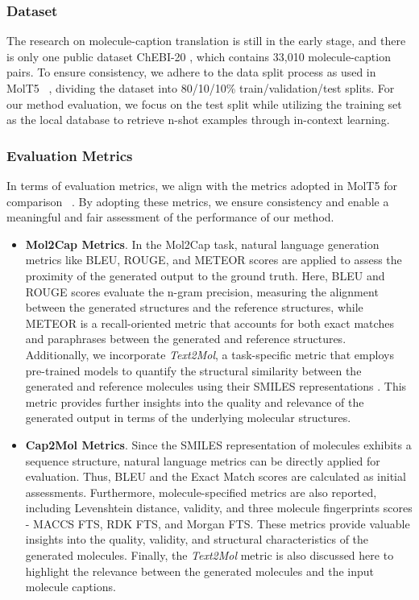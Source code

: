 \documentclass{article}
\theoremstyle{plain}
\theoremstyle{definition}
\theoremstyle{remark}
\begin{document}
\subsubsection{Dataset}
The research on molecule-caption translation is still in the early stage, and there is only one public dataset ChEBI-20 \cite{edwards2021text2mol}, which contains 33,010 molecule-caption pairs. To ensure consistency, we adhere to the data split process as used in MolT5 ~\cite{edwards-etal-2022-translation}, dividing the dataset into 80/10/10\% train/validation/test splits. 
For our method evaluation, we focus on the test split while utilizing the training set as the local database to retrieve n-shot examples through in-context learning. 

\subsubsection{Evaluation Metrics}
In terms of evaluation metrics, we align with the metrics adopted in MolT5 for comparison ~\cite{edwards-etal-2022-translation}. By adopting these metrics, we ensure consistency and enable a meaningful and fair assessment of the performance of our method.
\begin{itemize}

\item \textbf{Mol2Cap Metrics}. 
In the Mol2Cap task, natural language generation metrics like BLEU, ROUGE, and METEOR scores are applied to assess the proximity of the generated output to the ground truth. 
Here, BLEU and ROUGE scores evaluate the n-gram precision, measuring the alignment between the generated structures and the reference structures, while METEOR is a recall-oriented metric that accounts for both exact matches and paraphrases between the generated and reference structures.
Additionally, we incorporate \emph{Text2Mol}, a task-specific metric that employs pre-trained models to quantify the structural similarity between the generated and reference molecules using their SMILES representations \cite{edwards2021text2mol}.
This metric provides further insights into the quality and relevance of the generated output in terms of the underlying molecular structures.

\item \textbf{Cap2Mol Metrics}. 
Since the SMILES representation of molecules exhibits a sequence structure, natural language metrics can be directly applied for evaluation. Thus, BLEU and the Exact Match scores are calculated as initial assessments. 
Furthermore, molecule-specified metrics are also reported, including Levenshtein distance, validity, and three molecule fingerprints scores - MACCS FTS, RDK FTS, and Morgan FTS. 
These metrics provide valuable insights into the quality, validity, and structural characteristics of the generated molecules. Finally, the \emph{Text2Mol} metric is also discussed here to highlight the relevance between the generated molecules and the input molecule captions. 
\end{itemize}
\end{document}
